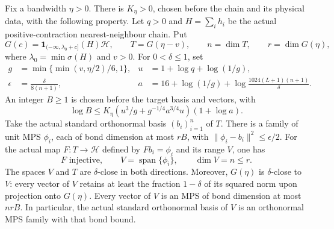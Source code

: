 \begin{lemma}
    \label{thm:low_energy_orthonormal_mps_basis}
    \leanok
    Fix a bandwidth $\eta>0$. There is $K_\eta>0$, chosen before
    the chain and its physical data, with the following property.
    Let $q>0$ and $H=\sum_i h_i$ be the actual positive-contraction
    nearest-neighbour chain. Put
    \[
       G(c)=\mathbf1_{(-\infty,\lambda_0+c]}(H)\mathcal H,\qquad
       T=G(\eta-v),\qquad n=\dim T,\qquad r=\dim G(\eta),
    \]
    where $\lambda_0=\min\sigma(H)$ and $v>0$.
    For $0<\delta\le1$, set
    \begin{align*}
      g&=\min\{\min(v,\eta/2)/6,1\},&
      u&=1+\log q+\log(1/g),\\
      \epsilon&=\frac{\delta}{8(n+1)},&
      a&=16+\log(1/g)+\log\frac{1024(L+1)(n+1)}\delta.
    \end{align*}
    An integer $B\ge1$ is chosen before the target basis and vectors,
    with
    \[
       \log B\le K_\eta
        \left(u^3/g+g^{-1/4}a^{3/4}u\right)(1+\log a).
    \]
    Take the actual standard orthonormal basis $(b_i)_{i=1}^n$ of $T$.
    There is a family of unit MPS $\phi_i$, each of bond dimension at
    most $rB$, with $\|\phi_i-b_i\|^2\le\epsilon/2$.
    For the actual map $F:T\to\mathcal H$ defined by $Fb_i=\phi_i$
    and its range $V$, one has
    \[
      F\text{ injective},\qquad
      V=\operatorname{span}\{\phi_i\},\qquad \dim V=n\le r.
    \]
    The spaces $V$ and $T$ are $\delta$-close in both directions.
    Moreover, $G(\eta)$ is $\delta$-close to $V$: every vector of $V$
    retains at least the fraction $1-\delta$ of its squared norm upon
    projection onto $G(\eta)$.
    Every vector of $V$ is an MPS of bond dimension at most $nrB$.
    In particular, the actual standard orthonormal basis of $V$ is an
    orthonormal MPS family with that bond bound.
\end{lemma}

